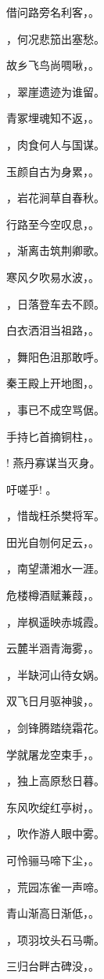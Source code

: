 \documentclass[12pt, a4paper, addpoints]{exam}
\begin{document}
\begin{questions}
\question[3] 借问路旁名利客，\fillin。

\question[3] \fillin，何况悲笳出塞愁。

\question[3] 故乡飞鸟尚啁啾，\fillin。

\question[3] \fillin，翠崖遗迹为谁留。

\question[3] 青冢埋魂知不返，\fillin。

\question[3] \fillin，肉食何人与国谋。

\question[3] 玉颜自古为身累，\fillin。

\question[3] \fillin，岩花涧草自春秋。

\question[3] 行路至今空叹息，\fillin。

\question[3] \fillin，渐离击筑荆卿歌。

\question[3] 寒风夕吹易水波，\fillin。

\question[3] \fillin，日落登车去不顾。

\question[3] 白衣洒泪当祖路，\fillin。

\question[3] \fillin，舞阳色沮那敢呼。

\question[3] 秦王殿上开地图，\fillin。

\question[3] \fillin，事已不成空骂倨。

\question[3] 手持匕首摘铜柱，\fillin。

\question[3] \fillin! 燕丹寡谋当灭身。

\question[3] 吁嗟乎! \fillin。

\question[3] \fillin，惜哉枉杀樊将军。

\question[3] 田光自刎何足云，\fillin。

\question[3] \fillin，南望潇湘水一涯。

\question[3] 危楼樽酒赋蒹葭，\fillin。

\question[3] \fillin，岸枫遥映赤城霞。

\question[3] 云麓半涵青海雾，\fillin。

\question[3] \fillin，半缺河山待女娲。

\question[3] 双飞日月驱神骏，\fillin。

\question[3] \fillin，剑锋腾踏绕霜花。

\question[3] 学就屠龙空束手，\fillin。

\question[3] \fillin，独上高原愁日暮。

\question[3] 东风吹绽红亭树，\fillin。

\question[3] \fillin，吹作游人眼中雾。

\question[3] 可怜骊马啼下尘，\fillin。

\question[3] \fillin，荒园冻雀一声啼。

\question[3] 青山渐高日渐低，\fillin。

\question[3] \fillin，项羽坟头石马嘶。

\question[3] 三归台畔古碑没，\fillin。

\end{questions}
\end{document}
